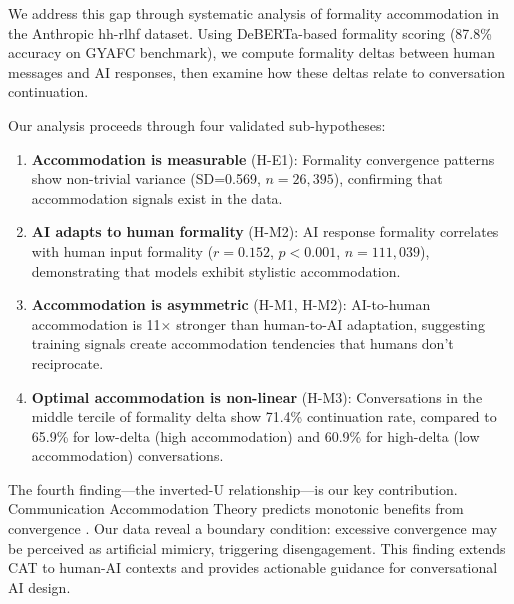 We address this gap through systematic analysis of formality accommodation in the Anthropic hh-rlhf dataset. Using DeBERTa-based formality scoring (87.8\% accuracy on GYAFC benchmark), we compute formality deltas between human messages and AI responses, then examine how these deltas relate to conversation continuation.

Our analysis proceeds through four validated sub-hypotheses:

\begin{enumerate}
    \item \textbf{Accommodation is measurable} (H-E1): Formality convergence patterns show non-trivial variance (SD=0.569, $n=26,395$), confirming that accommodation signals exist in the data.

    \item \textbf{AI adapts to human formality} (H-M2): AI response formality correlates with human input formality ($r=0.152$, $p<0.001$, $n=111,039$), demonstrating that models exhibit stylistic accommodation.

    \item \textbf{Accommodation is asymmetric} (H-M1, H-M2): AI-to-human accommodation is 11$\times$ stronger than human-to-AI adaptation, suggesting training signals create accommodation tendencies that humans don't reciprocate.

    \item \textbf{Optimal accommodation is non-linear} (H-M3): Conversations in the middle tercile of formality delta show 71.4\% continuation rate, compared to 65.9\% for low-delta (high accommodation) and 60.9\% for high-delta (low accommodation) conversations.
\end{enumerate}

The fourth finding---the inverted-U relationship---is our key contribution. Communication Accommodation Theory predicts monotonic benefits from convergence \citep{niederhoffer2002linguistic}. Our data reveal a boundary condition: excessive convergence may be perceived as artificial mimicry, triggering disengagement. This finding extends CAT to human-AI contexts and provides actionable guidance for conversational AI design.
